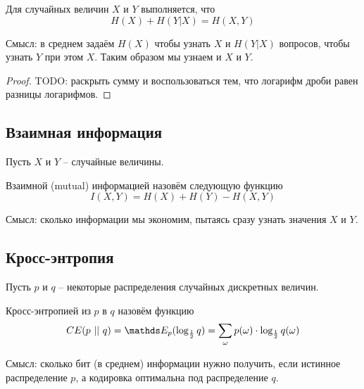 \documentclass{article}
\begin{document}
\begin{theorem}
    Для случайных величин $X$ и $Y$ выполняется, что
    \[
        H(X) + H(Y|X) = H(X, Y)  
    \]

    \footnotesize{
        Смысл: в среднем задаём $H(X)$ чтобы узнать $X$ и $H(Y|X)$ вопросов, чтобы узнать $Y$ при этом $X$. Таким образом мы узнаем и $X$ и $Y$.
    }
\end{theorem}

\begin{proof}
    TODO: раскрыть сумму и воспользоваться тем, что логарифм дроби равен разницы логарифмов.
\end{proof}

\subsection{Взаимная информация}

Пусть $X$ и $Y$ -- случайные величины.

\begin{definition}
    Взаимной (mutual) информацией назовём следующую функцию
    \[
        I(X, Y) = H(X) + H(Y) - H(X, Y)  
    \]

    \footnotesize{
        Смысл: сколько информации мы экономим, пытаясь сразу узнать значения $X$ и $Y$.
    }
\end{definition}

\subsection{Кросс-энтропия}

Пусть $p$ и $q$ -- некоторые распределения случайных дискретных величин.

\begin{definition}
    Кросс-энтропией из $p$ в $q$ назовём функцию
    \[
        CE(p\ ||\ q) = \E_p(\log_{\frac 12} q) = \sum_{\omega} p(\omega) \cdot \log_{\frac12} q(\omega)  
    \]

    \footnotesize{
        Смысл: сколько бит (в среднем) информации нужно получить, если истинное распределение $p$, а кодировка оптимальна под распределение $q$.
    }
\end{definition}
\end{document}
